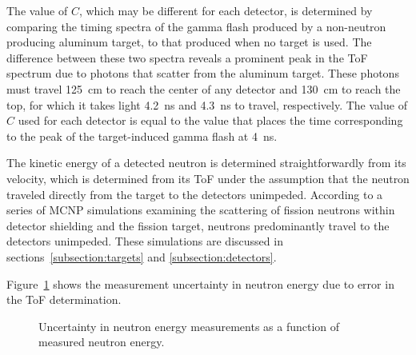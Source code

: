 The value of $C$, which may be different for each detector, is determined by comparing the timing spectra of the gamma flash produced by a non-neutron producing aluminum target, to that produced when no target is used.
The difference between these two spectra reveals a prominent peak in the ToF spectrum due to photons that scatter from the aluminum target.
These photons must travel 125~cm to reach the center of any detector and 130~cm to reach the top, for which it takes light 4.2~ns and 4.3~ns to travel, respectively.
The value of $C$ used for each detector is equal to the value that places the time corresponding to the peak of the target-induced gamma flash at 4~ns.

The kinetic energy of a detected neutron is determined straightforwardly from its velocity, which is determined from its ToF under the assumption that the neutron traveled directly from the target to the detectors unimpeded.
According to a series of MCNP simulations examining the scattering of fission neutrons within detector shielding and the fission target, neutrons predominantly travel to the detectors unimpeded.
These simulations are discussed in sections~\ref{subsection:targets} and \ref{subsection:detectors}.

Figure~\ref{fig:ErgUncertainty} shows the measurement uncertainty in neutron energy due to error in the ToF determination.
\begin{figure}[]
    \caption{%
    Uncertainty in neutron energy measurements as a function of measured neutron energy.}
    \label{fig:ErgUncertainty}
\end{figure}
